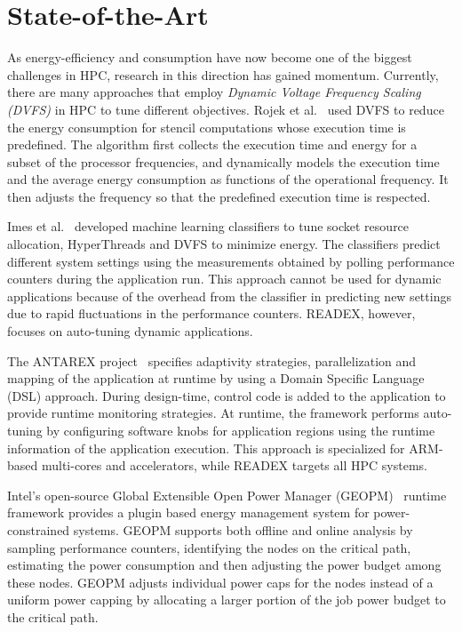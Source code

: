 \section{State-of-the-Art} \label{sec:related-work}
As energy-efficiency and consumption have now become one of the biggest challenges in HPC, research in this direction has gained momentum. Currently, there are many approaches that employ \textit{Dynamic Voltage Frequency Scaling (DVFS)} in HPC to tune different objectives. Rojek et al.~\cite{Rojek} used DVFS to reduce the energy consumption for stencil computations whose execution time is predefined. The algorithm first collects the execution time and energy for a subset of the processor frequencies, and dynamically models the execution time and the average energy consumption as functions of the operational frequency. It then adjusts the frequency so that the predefined execution time is respected.

Imes et al.~\cite{Imes} developed machine learning classifiers to tune socket resource allocation, HyperThreads and DVFS to minimize energy. The classifiers predict different system settings using the measurements obtained by polling performance counters during the application run. This approach cannot be used for dynamic applications because of the overhead from the classifier in predicting new settings due to rapid fluctuations in the performance counters. READEX, however, focuses on auto-tuning dynamic applications.
	
The ANTAREX project~\cite{silvano2016antarex} specifies adaptivity strategies, parallelization and mapping of the application at runtime by using a Domain Specific Language (DSL) approach. During design-time, control code is added to the application to provide runtime monitoring strategies. At runtime, the framework performs auto-tuning by configuring software knobs for application regions using the runtime information of the application execution. This approach is specialized for ARM-based multi-cores and accelerators, while READEX targets all HPC systems.

Intel's open-source Global Extensible Open Power Manager (GEOPM)~\cite{geopm} runtime framework provides a plugin based energy management system for power-constrained systems. GEOPM supports both offline and online analysis by sampling performance counters, identifying the nodes on the critical path, estimating the power consumption and then adjusting the power budget among these nodes. GEOPM adjusts individual power caps for the nodes instead of a uniform power capping by allocating a larger portion of the job power budget to the critical path. 
	
